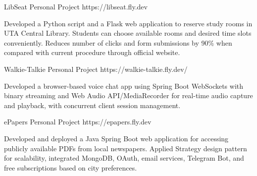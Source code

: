 \documentclass[10pt]{article}
\begin{document}
{        \project
        {LibSeat}
        {Personal Project}
        {https://libseat.fly.dev}
        {\begin{newitemize}
            \item {Developed a Python script and a Flask web application to reserve study rooms in UTA Central Library. Students can choose available rooms and desired time slots conveniently. Reduces number of clicks and form submissions by 90\% when compared with current procedure through official website.}
	\end{newitemize}}
 

        \project
        {Walkie-Talkie}
        {Personal Project}
        {https://walkie-talkie.fly.dev/}
        {\begin{newitemize}
            \item Developed a browser-based voice chat app using Spring Boot WebSockets with binary streaming and Web Audio API/MediaRecorder for real-time audio capture and playback, with concurrent client session management.
        \end{newitemize}}

        \project
        {ePapers}
        {Personal Project}
        {https://epapers.fly.dev}
        {\begin{newitemize}
            \item {Developed and deployed a Java Spring Boot web application for accessing publicly available PDFs from local newspapers. Applied Strategy design pattern for scalability, integrated MongoDB, OAuth, email services, Telegram Bot, and free subscriptions based on city preferences.}
	\end{newitemize}}
 
}
\end{document}
